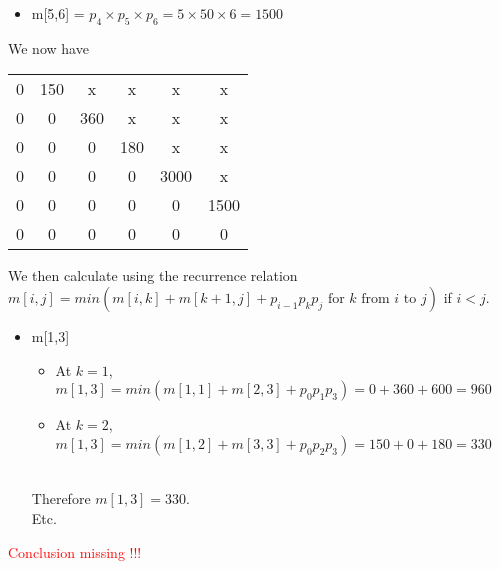 \documentclass[11pt]{article}
\begin{document}
\begin{enumerate}
\begin{itemize}
        \item m[5,6] = $p_4 \times p_5 \times p_6 = 5 \times 50 \times 6 = 1500$
    \end{itemize}
    We now have 
    \begin{tabular}{ c c c c c c }
    0 & 150 & x & x & x & x \\
    0 & 0 & 360 & x & x & x \\
    0 & 0 & 0 & 180 & x & x \\
    0 & 0 & 0 & 0 & 3000 & x \\
    0 & 0 & 0 & 0 & 0 & 1500 \\
    0 & 0 & 0 & 0 & 0 & 0 \\
    \end{tabular}
    We then calculate using the recurrence relation $m[i,j] = min(m[i,k] + m[k+1, j] + p_{i-1}p_kp_j \mbox{ for } k \mbox{ from } i \mbox{ to } j)$ if $i < j$.
    \begin{itemize}
        \item m[1,3]
        \begin{itemize}
            \item At $k = 1$, $m[1,3] = min(m[1,1] + m[2, 3] + p_{0}p_1p_3) = 0+360+600 = 960$
            \item At $k = 2$, $m[1,3] = min(m[1,2] + m[3, 3] + p_{0}p_2p_3) = 150+0+180 = 330$
        \end{itemize}
        \\ Therefore $m[1,3] = 330$.
        \\ Etc.
    \end{itemize}
    \textcolor{red}{Conclusion missing !!!}
    
    
    

\end{enumerate}
\end{document}
